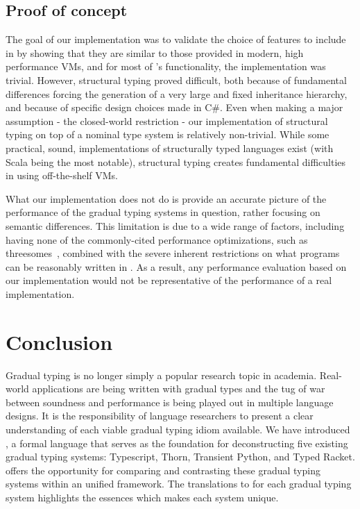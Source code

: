 \documentclass[acmlarge, anonymous, authordraft]{acmart}
\begin{document}
\subsection{Proof of concept}

The goal of our implementation was to validate the choice of features to
include in \kafka by showing that they are similar to those provided in
modern, high performance VMs, and for most of \kafka's functionality, the
implementation was trivial. However, structural typing proved difficult, both
because of fundamental differences forcing the generation of a very large and
fixed inheritance hierarchy, and because of specific design choices made in
C\#. Even when making a major assumption - the closed-world restriction - our
implementation of structural typing on top of a nominal type system is
relatively non-trivial. While some practical, sound, implementations of
structurally typed languages exist (with Scala being the most notable),
structural typing creates fundamental difficulties in using off-the-shelf VMs.

What our implementation does not do is provide an accurate picture of the
performance of the gradual typing systems in question, rather focusing on
semantic differences. This limitation is due to a wide range of factors,
including having none of the commonly-cited performance optimizations, such as
threesomes~\cite{siek10}, combined with the severe inherent restrictions on
what programs can be reasonably written in \kafka. As a result, any
performance evaluation based on our \kafka implementation would not be
representative of the performance of a real implementation. %


\section{Conclusion}

Gradual typing is no longer simply a popular research topic in academia.
Real-world applications are being written with gradual types and the tug of
war between soundness and performance is being played out in multiple
language designs.  It is the responsibility of language researchers to
present a clear understanding of each viable gradual typing idiom available.
We have introduced \kafka, a formal language that serves as the foundation
for deconstructing five existing gradual typing systems: Typescript, Thorn,
Transient Python, and Typed Racket.
\kafka offers the
opportunity for comparing and contrasting these gradual typing systems
within an unified framework. The translations to \kafka for each gradual
typing system highlights the essences which makes each system unique.
\end{document}
